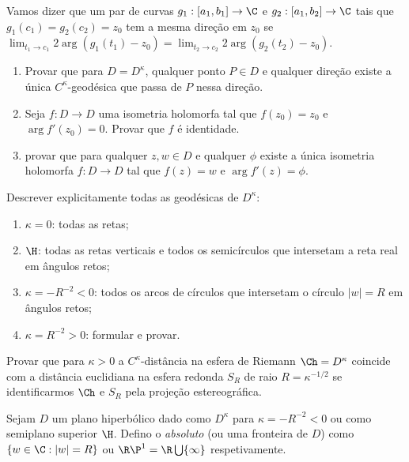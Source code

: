 \begin{problema}
Vamos dizer que um par de curvas $g_1 : [a_1,b_1] \to \C$ e $g_2 : [a_1,b_2] \to \C$
tais que $g_1(c_1) = g_2(c_2) = z_0$ tem a mesma direção em $z_0$ se
$\lim_{t_1\to c_1} 2\arg(g_1(t_1)-z_0) = \lim_{t_2\to c_2} 2\arg(g_2(t_2)-z_0)$.
\begin{enumerate}
\item Provar que para $D = D^\kappa$, qualquer ponto $P \in D$
e qualquer direção existe a única $C^\kappa$-geodésica que passa de $P$ nessa direção.
\item Seja $f : D \to D$ uma isometria holomorfa tal que $f(z_0) = z_0$ e $\arg f'(z_0) = 0$.
Provar que $f$ é identidade.
\item provar que para qualquer $z,w\in D$ e qualquer $\phi$ existe a única isometria holomorfa $f : D\to D$
tal que $f(z) = w$ e $\arg f'(z) = \phi$.
\end{enumerate}
\end{problema}

\begin{problema}
Descrever explicitamente todas as geodésicas de $D^\kappa$:
\begin{enumerate}
\item $\kappa = 0$: todas as retas;
\item $\H$: todas as retas verticais e todos os semicírculos que intersetam a reta real em ângulos retos;
\item $\kappa = -R^{-2} < 0$: todos os arcos de círculos que intersetam o círculo $|w|=R$ em ângulos retos;
\item $\kappa = R^{-2} > 0$: formular e provar.
\end{enumerate}
\end{problema}


\begin{problema}
Provar que para $\kappa > 0$ a $C^\kappa$-distância na esfera de Riemann $\Ch = D^\kappa$
coincide com a distância euclidiana na esfera redonda $S_R$ de raio $R = \kappa^{-1/2}$
se identificarmos $\Ch$ e $S_R$ pela projeção estereográfica.
\end{problema}


\begin{defin}[Absoluto]
Sejam $D$ um plano hiperbólico dado como $D^\kappa$ para $\kappa = -R^{-2} < 0$
ou como semiplano superior $\H$.
Defino o \emph{absoluto} (ou uma fronteira de $D$) como
$\{w\in\C: |w| = R\}$ ou $\R\P^1 = \R \bigcup \{\infty\}$ respetivamente.
\end{defin}

